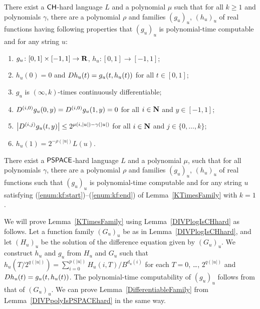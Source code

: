  \begin{lemma}
  \label{KTimesFamily}
  There exist a $\mathsf{CH}$-hard language $L$ and a polynomial $\mu$ 
  such that for all $k \ge 1$ and polynomials $\gamma$,
  there are a polynomial $\rho$ and families $(g_u)_u$, $(h_u)_u$ of real functions
  having following properties that $(g_u)_u$ is polynomial-time computable and for any string $u$:
  \begin{enumerate}
   \item \label{enum:kf:start}
	 $g_u\colon [0,1] \times [-1,1]\to \mathbf R$, $h_u\colon [0,1] \to [-1,1]$;
   \item \label{enum:equation}
	 $h_u(0) = 0$ and $D h_u(t) = g_u(t, h_u(t))$ for all $t \in [0,1]$;
   \item \label{enum:differentiability}
         $g_u$ is $(\infty, k)$-times continuously differentiable;
   \item \label{enum:boundary}
	 $
	 D^{(i, 0)} g_u(0,y) = D^{(i, 0)} g_u(1,y) = 0
         $ for all $i \in \mathbf N$ and $y \in [-1,1]$;
   \item \label{enum:smooth}
	 $
	 \left|D^{(i,j)} g_u(t,y)\right| \le 2^{\mu(i, |u|) - \gamma(|u|)}
         $ for all $i \in \mathbf N$ and $j \in \{0, \dots, k\}$;
   \item \label{enum:kf:end}
	 $h_u(1) = 2^{-\rho(|u|)} L(u)$.
  \end{enumerate}
 \end{lemma}

\begin{lemma}
 \label{DifferentiableFamily}
 There exist a $\mathsf{PSPACE}$-hard language $L$ and a polynomial $\mu$,
 such that for all polynomials $\gamma$,
 there are a polynomial $\rho$ and families $(g_u)_u$, $(h_u)_u$ of real functions
 such that $(g_u)_u$ is polynomial-time computable and for any string $u$
 satisfying (\ref{enum:kf:start})--(\ref{enum:kf:end}) of Lemma~\ref{KTimesFamily} with $k = 1$.
\end{lemma}

We will prove Lemma~\ref{KTimesFamily} using Lemma~\ref{DIVPlogIsCHhard} as follows.
Let a function family $(G_u)_u$ be as in Lemma~\ref{DIVPlogIsCHhard},
and let $(H_u)_u$ be the solution of the difference equation given by $(G_u)_u$.
We construct $h_u$ and $g_u$ from $H_u$ and $G_u$ 
such that $h_u(T/2^{q(|u|)}) = \sum^{p(|u|)}_{i = 0} H_u(i, T)/B^{d_u(i)}$ for each $T = 0$, \ldots, $2^{q(|u|)}$
and $D h_u(t) = g_u(t, h_u(t))$.
The polynomial-time computability of $(g_u)_u$ follows from that of $(G_u)_u$.
We can prove Lemma~\ref{DifferentiableFamily} from Lemma~\ref{DIVPpolyIsPSPACEhard} in the same way.

